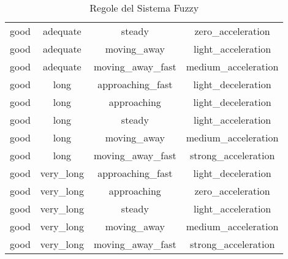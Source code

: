 \begin{table}[htbp]
\begin{tabular}{|c|c|c|c|}
            good      & adequate    & steady               & zero\_acceleration \\
            good      & adequate    & moving\_away         & light\_acceleration \\
            good      & adequate    & moving\_away\_fast   & medium\_acceleration \\
            good      & long        & approaching\_fast     & light\_deceleration \\
            good      & long        & approaching          & light\_deceleration \\
            good      & long        & steady               & light\_acceleration \\
            good      & long        & moving\_away         & medium\_acceleration \\
            good      & long        & moving\_away\_fast   & strong\_acceleration \\
            good      & very\_long  & approaching\_fast     & light\_deceleration \\
            good      & very\_long  & approaching          & zero\_acceleration \\
            good      & very\_long  & steady               & light\_acceleration \\
            good      & very\_long  & moving\_away         & medium\_acceleration \\
            good      & very\_long  & moving\_away\_fast   & strong\_acceleration \\
            \hline
    \end{tabular}
    \caption{Regole del Sistema Fuzzy}
    \label{tab:regole_fuzzy}
\end{table}

